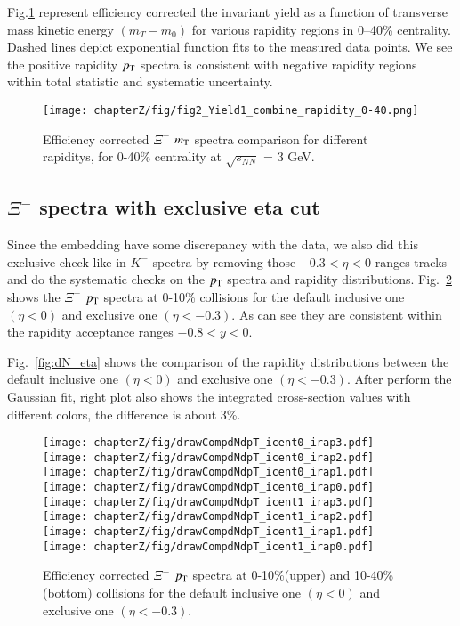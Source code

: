 Fig.\ref{fig:dNdmT_rap_check} represent efficiency corrected the invariant yield as a function of transverse mass kinetic energy $(m_{T}-m_{0})$ for various rapidity regions in 0–40\% centrality. Dashed lines depict exponential function fits to the measured data points. We see the positive rapidity $p_{\rm T}$ spectra is consistent with negative rapidity regions within total statistic and systematic uncertainty.
\begin{figure*}[hbt!]
\texttt{[image: chapterZ/fig/fig2\_Yield1\_combine\_rapidity\_0-40.png]}
\caption{Efficiency corrected $\Xi^{-}$ $m_{\rm T}$ spectra comparison for different rapiditys, for 0-40\% centrality at $\sqrt{s_{NN}}$ = 3 GeV.}
\label{fig:dNdmT_rap_check}
\end{figure*}

\subsection{$\Xi^{-}$ spectra with exclusive eta cut}
Since the embedding have some discrepancy with the data, we also did this exclusive check like in $K^{-}$ spectra by removing those $-0.3<\eta<0$ ranges tracks and do the systematic checks on the $p_{\rm T}$ spectra and rapidity distributions. Fig.~\ref{fig:dNdpT_eta} shows the $\Xi^{-}$ $p_{\rm T}$ spectra at 0-10\% collisions for the default inclusive one $(\eta<0)$ and exclusive one $(\eta<-0.3)$. As can see they are consistent within the rapidity acceptance ranges $-0.8<y<0$.

Fig.~\ref{fig:dN_eta} shows the comparison of the rapidity distributions between the default inclusive one $(\eta<0)$ and exclusive one $(\eta<-0.3)$. After perform the Gaussian fit, right plot also shows the integrated cross-section values with different colors, the difference is about 3\%.

\begin{figure*}[hbt!]
\texttt{[image: chapterZ/fig/drawCompdNdpT\_icent0\_irap3.pdf]}
\texttt{[image: chapterZ/fig/drawCompdNdpT\_icent0\_irap2.pdf]}
\texttt{[image: chapterZ/fig/drawCompdNdpT\_icent0\_irap1.pdf]}
\texttt{[image: chapterZ/fig/drawCompdNdpT\_icent0\_irap0.pdf]}
\texttt{[image: chapterZ/fig/drawCompdNdpT\_icent1\_irap3.pdf]}
\texttt{[image: chapterZ/fig/drawCompdNdpT\_icent1\_irap2.pdf]}
\texttt{[image: chapterZ/fig/drawCompdNdpT\_icent1\_irap1.pdf]}
\texttt{[image: chapterZ/fig/drawCompdNdpT\_icent1\_irap0.pdf]}
\caption{Efficiency corrected $\Xi^{-}$ $p_{\rm T}$ spectra at 0-10\%(upper) and 10-40\%(bottom) collisions for the default inclusive one $(\eta<0)$ and exclusive one $(\eta<-0.3)$.}
\label{fig:dNdpT_eta}
\end{figure*}


